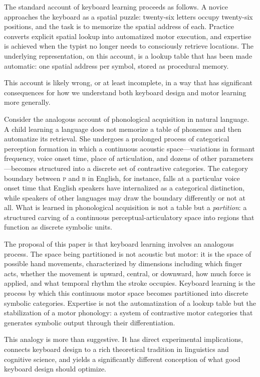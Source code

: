 \documentclass[12pt,a4paper]{article}
\theoremstyle{plain}
\theoremstyle{definition}
\theoremstyle{remark}
\begin{document}
The standard account of keyboard learning proceeds as follows. A novice
approaches the keyboard as a spatial puzzle: twenty-six letters occupy
twenty-six positions, and the task is to memorize the spatial address of each.
Practice converts explicit spatial lookup into automatized motor execution,
and expertise is achieved when the typist no longer needs to consciously
retrieve locations. The underlying representation, on this account, is a
lookup table that has been made automatic: one spatial address per symbol,
stored as procedural memory.

This account is likely wrong, or at least incomplete, in a way that has
significant consequences for how we understand both keyboard design and motor
learning more generally.

Consider the analogous account of phonological acquisition in natural language.
A child learning a language does not memorize a table of phonemes and then
automatize its retrieval. She undergoes a prolonged process of categorical
perception formation in which a continuous acoustic space---variations in
formant frequency, voice onset time, place of articulation, and dozens of
other parameters---becomes structured into a discrete set of contrastive
categories. The category boundary between \textsc{p} and \textsc{b} in English,
for instance, falls at a particular voice onset time that English speakers
have internalized as a categorical distinction, while speakers of other languages
may draw the boundary differently or not at all. What is learned in phonological
acquisition is not a table but a \emph{partition}: a structured carving of a
continuous perceptual-articulatory space into regions that function as discrete
symbolic units.

The proposal of this paper is that keyboard learning involves an analogous
process. The space being partitioned is not acoustic but motor: it is the space
of possible hand movements, characterized by dimensions including which finger
acts, whether the movement is upward, central, or downward, how much force is
applied, and what temporal rhythm the stroke occupies. Keyboard learning is the
process by which this continuous motor space becomes partitioned into discrete
symbolic categories. Expertise is not the automatization of a lookup table but
the stabilization of a motor phonology: a system of contrastive motor categories
that generates symbolic output through their differentiation.

This analogy is more than suggestive. It has direct experimental implications,
connects keyboard design to a rich theoretical tradition in linguistics and
cognitive science, and yields a significantly different conception of what
good keyboard design should optimize.
\end{document}
